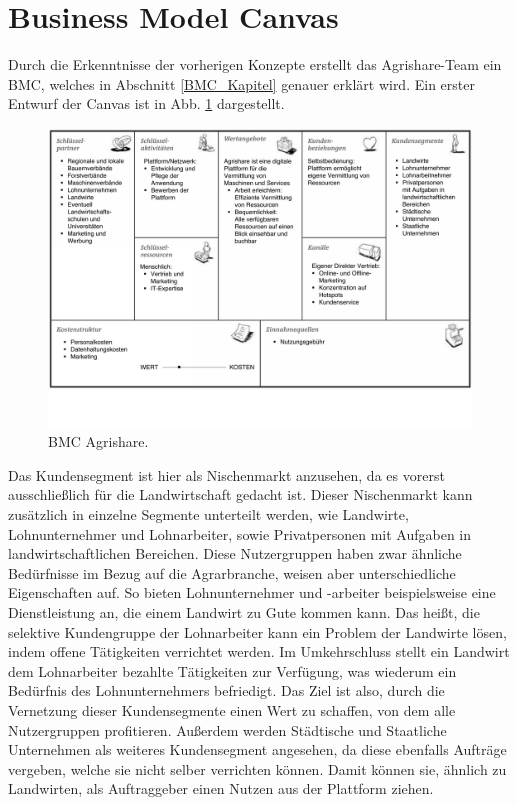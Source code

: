 \section{Business Model Canvas}
Durch die Erkenntnisse der vorherigen Konzepte erstellt das Agrishare-Team ein \ac{BMC}, welches in Abschnitt \ref{BMC_Kapitel} genauer erklärt wird. Ein erster Entwurf der Canvas ist in Abb. \ref{BMC_Agrishare} dargestellt.
\begin{figure}[h!]
		\includegraphics[angle=90,origin=c,width=\textwidth]{99_PDF_INCLUDE/BMC_draft.pdf}
		\caption{\acl{BMC} Agrishare.}
		\label{BMC_Agrishare}
\end{figure}

Das Kundensegment ist hier als Nischenmarkt anzusehen, da es vorerst ausschließlich für die Landwirtschaft gedacht ist. Dieser Nischenmarkt kann zusätzlich in einzelne Segmente unterteilt werden, wie Landwirte, Lohnunternehmer und Lohnarbeiter, sowie Privatpersonen mit Aufgaben in landwirtschaftlichen Bereichen. Diese Nutzergruppen haben zwar ähnliche Bedürfnisse im Bezug auf die Agrarbranche, weisen aber unterschiedliche Eigenschaften auf. So bieten Lohnunternehmer und -arbeiter beispielsweise eine Dienstleistung an, die einem Landwirt zu Gute kommen kann. Das heißt, die selektive Kundengruppe der Lohnarbeiter kann ein Problem der Landwirte lösen, indem offene Tätigkeiten verrichtet werden. Im Umkehrschluss stellt ein Landwirt dem Lohnarbeiter bezahlte Tätigkeiten zur Verfügung, was wiederum ein Bedürfnis des Lohnunternehmers befriedigt. Das Ziel ist also, durch die Vernetzung dieser Kundensegmente einen Wert zu schaffen, von dem alle Nutzergruppen profitieren. Außerdem werden Städtische und Staatliche Unternehmen als weiteres Kundensegment angesehen, da diese ebenfalls Aufträge vergeben, welche sie nicht selber verrichten können. Damit können sie, ähnlich zu Landwirten, als Auftraggeber einen Nutzen aus der Plattform ziehen.


